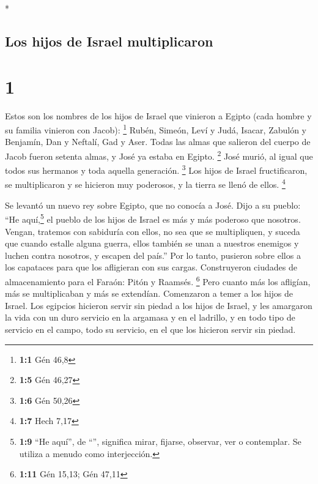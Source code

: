 \begin{paracol}{2} \switchcolumn[0]*

\hypertarget{los-hijos-de-israel-multiplicaron}{%
\subsection{Los hijos de Israel
multiplicaron}\label{los-hijos-de-israel-multiplicaron}}

\hypertarget{section}{%
\section{1}\label{section}}

 Estos son los nombres de los hijos de Israel que vinieron
a Egipto (cada hombre y su familia vinieron con Jacob): \footnote{\textbf{1:1}
  Gén 46,8}  Rubén, Simeón, Leví y Judá, 
Isacar, Zabulón y Benjamín,  Dan y Neftalí, Gad y Aser.
 Todas las almas que salieron del cuerpo de Jacob fueron
setenta almas, y José ya estaba en Egipto. \footnote{\textbf{1:5} Gén
  46,27}  José murió, al igual que todos sus hermanos y
toda aquella generación. \footnote{\textbf{1:6} Gén 50,26}
 Los hijos de Israel fructificaron, se multiplicaron y se
hicieron muy poderosos, y la tierra se llenó de ellos. \footnote{\textbf{1:7}
  Hech 7,17}

 Se levantó un nuevo rey sobre Egipto, que no conocía a
José.  Dijo a su pueblo: ``He aquí,\footnote{\textbf{1:9}
  ``He aquí'', de ``'', significa mirar, fijarse, observar,
  ver o contemplar. Se utiliza a menudo como interjección.} el pueblo de
los hijos de Israel es más y más poderoso que nosotros. 
Vengan, tratemos con sabiduría con ellos, no sea que se multipliquen, y
suceda que cuando estalle alguna guerra, ellos también se unan a
nuestros enemigos y luchen contra nosotros, y escapen del país.''
 Por lo tanto, pusieron sobre ellos a los capataces para
que los afligieran con sus cargas. Construyeron ciudades de
almacenamiento para el Faraón: Pitón y Raamsés. \footnote{\textbf{1:11}
  Gén 15,13; Gén 47,11}  Pero cuanto más los afligían,
más se multiplicaban y más se extendían. Comenzaron a temer a los hijos
de Israel.  Los egipcios hicieron servir sin piedad a los
hijos de Israel,  y les amargaron la vida con un duro
servicio en la argamasa y en el ladrillo, y en todo tipo de servicio en
el campo, todo su servicio, en el que los hicieron servir sin piedad.


\end{paracol}
